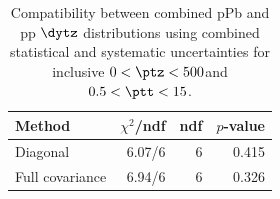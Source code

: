\begin{table}[htp!]
\centering
\begin{tabular}{|l|r|r|r|}
\hline
Method & $\chi^2$/ndf & ndf & $p$-value \\
\hline
Diagonal & 6.07/6 & 6 & 0.415 \\
Full covariance & 6.94/6 & 6 & 0.326 \\
\hline
\end{tabular}
\caption{Compatibility between combined pPb and pp $\dytz$ distributions using combined statistical and systematic uncertainties for inclusive $0 < \ptz < 500$\GeV and $0.5 < \ptt < 15$\GeV.}
\label{table:chisq_deta}
\end{table}
